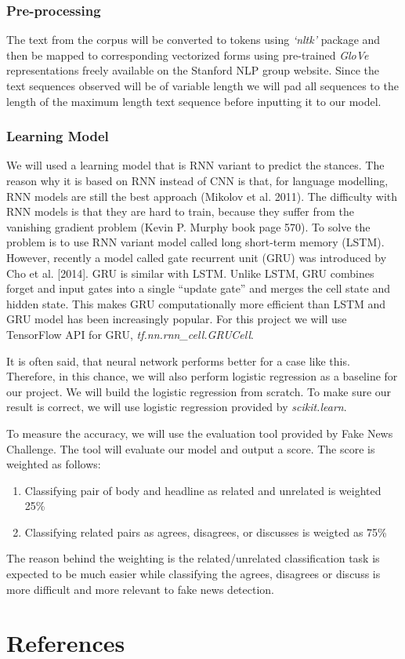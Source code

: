 \documentclass[12pt]{article}
\begin{document}
\subsubsection{Pre-processing}

The text from the corpus will be converted to tokens using \textit{‘nltk’} package and 
then be mapped to corresponding vectorized forms using  pre-trained \textit{GloVe} 
representations freely available on the Stanford NLP group website. 
Since the text sequences observed will be of variable length we will pad all 
sequences to the length of the maximum length text sequence before inputting 
it to our model.

\subsubsection{Learning Model}

We will used a learning model that is  RNN variant to predict the stances. 
The reason why it is based on RNN instead of CNN is that, for language 
modelling, RNN models are still the best approach (Mikolov et al. 2011).
The difficulty with RNN models is that they are hard to train, because they 
suffer from the vanishing gradient problem (Kevin P. Murphy book page 570). 
To solve the problem is to use RNN variant model called long short-term 
memory (LSTM). 
However, recently a model called gate recurrent unit (GRU) was introduced by 
Cho et al. [2014].
GRU is similar with LSTM. Unlike LSTM, GRU combines forget and input gates 
into a single “update gate” and merges the cell state and hidden state.
This makes GRU computationally more efficient than LSTM and GRU model has 
been increasingly popular. For this project we will use TensorFlow API for GRU,
\textit{tf.nn.rnn\_cell.GRUCell}. 

It is often said, that neural network performs better for a case like this. 
Therefore, in this chance, we will also perform logistic regression as a 
baseline for our project. We will build the logistic regression from scratch.
To make sure our result is correct, we will use logistic regression provided by
\textit{scikit.learn}.

To measure the accuracy, we will use the evaluation tool provided by 
Fake News Challenge. The tool will evaluate our model and output a score. 
The score is weighted as follows:
\begin{enumerate}
    \item Classifying pair of body and headline as related and unrelated is 
      weighted 25\%
    \item Classifying related pairs as agrees, disagrees, or discusses is 
      weigted as 75\%
\end{enumerate}
The reason behind the weighting is the related/unrelated classification task is
expected to be much easier while classifying the agrees, disagrees or discuss 
is more difficult and more relevant to fake news detection.

\section{References}
\end{document}
